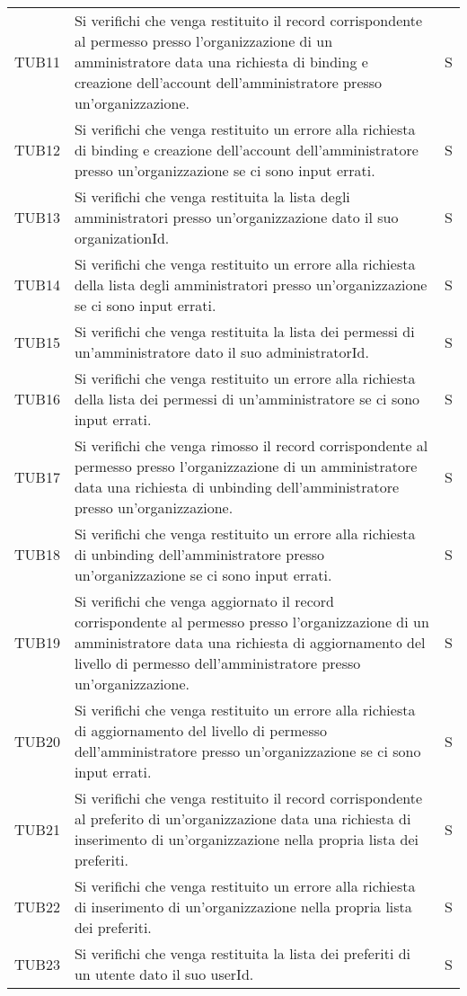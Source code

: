 {\begin{longtable}{ c C{13cm} C{1cm}}
TUB11 & Si verifichi che venga restituito il record corrispondente al permesso presso l'organizzazione di un amministratore data una richiesta di binding e creazione dell'account dell'amministratore presso un'organizzazione. & S \\
TUB12 & Si verifichi che venga restituito un errore alla richiesta di binding e creazione dell'account dell'amministratore presso un'organizzazione se ci sono input errati. & S \\
TUB13 & Si verifichi che venga restituita la lista degli amministratori presso un'organizzazione dato il suo organizationId. & S \\
TUB14 & Si verifichi che venga restituito un errore alla richiesta della lista degli amministratori presso un'organizzazione se ci sono input errati. & S \\
TUB15 & Si verifichi che venga restituita la lista dei permessi di un'amministratore dato il suo administratorId. & S \\
TUB16 & Si verifichi che venga restituito un errore alla richiesta della lista dei permessi di un'amministratore  se ci sono input errati. & S \\
TUB17 & Si verifichi che venga rimosso il record corrispondente al permesso presso l'organizzazione di un amministratore data una richiesta di unbinding dell'amministratore presso un'organizzazione. & S \\
TUB18 & Si verifichi che venga restituito un errore alla richiesta di unbinding dell'amministratore presso un'organizzazione se ci sono input errati. & S \\
TUB19 & Si verifichi che venga aggiornato il record corrispondente al permesso presso l'organizzazione di un amministratore data una richiesta di aggiornamento del livello di permesso dell'amministratore presso un'organizzazione. & S \\
TUB20 & Si verifichi che venga restituito un errore alla richiesta di aggiornamento del livello di permesso dell'amministratore presso un'organizzazione se ci sono input errati. & S \\
TUB21 & Si verifichi che venga restituito il record corrispondente al preferito di un'organizzazione data una richiesta di inserimento di un'organizzazione nella propria lista dei preferiti. & S \\
TUB22 & Si verifichi che venga restituito un errore alla richiesta di inserimento di un'organizzazione nella propria lista dei preferiti. & S \\
TUB23 & Si verifichi che venga restituita la lista dei preferiti di un utente dato il suo userId. & S \\

\end{longtable}}
